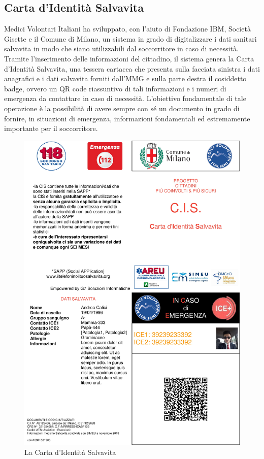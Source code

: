 \documentclass[12pt,a4paper,twoside,openright,titlepage]{book}
\begin{document}
\subsection{Carta d'Identità Salvavita}
Medici Volontari Italiani ha sviluppato, con l'aiuto di Fondazione IBM, Società Gisette e il Comune di Milano, un sistema in grado di digitalizzare i dati sanitari salvavita in modo che siano utilizzabili dal soccorritore in caso di necessità. Tramite l'inserimento delle informazioni del cittadino, il sistema genera la Carta d'Identità Salvavita, una tessera cartacea che presenta sulla facciata sinistra i dati anagrafici e i dati salvavita forniti dall'MMG e sulla parte destra il cosiddetto badge, ovvero un QR code riassuntivo di tali informazioni e i numeri di emergenza da contattare in caso di necessità. L'obiettivo fondamentale di tale operazione è la possibilità di avere sempre con sé un documento in grado di fornire, in situazioni di emergenza, informazioni fondamentali ed estremamente importante per il soccorritore.

\begin{figure}[H]
\centering
\includegraphics[scale = 0.2]{cis}
\caption{La Carta d'Identità Salvavita}
\end{figure}
\end{document}
